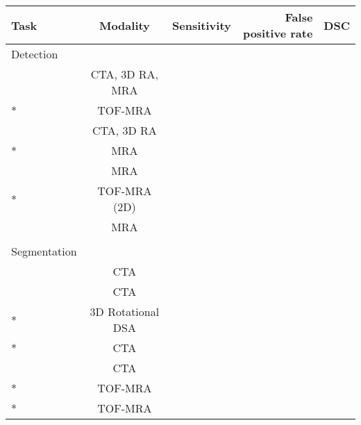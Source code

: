 \begin{table}[t]
	\centering
	\begin{tabular}{l c r r r}
		Task & Modality & Sensitivity & False positive rate & DSC \\
		\hline
		Detection & & & & \\
		\hspace{5mm}\citeauthor{Hentschke2014} & CTA, 3D RA, MRA & & & \\
		\hspace{5mm}\citeauthor{Joo2020}* & TOF-MRA & & & \\
		\hspace{5mm}\citeauthor{Lauric2010} & CTA, 3D RA & & & \\
		\hspace{5mm}\citeauthor{Nakao2018}* & MRA & & & \\
		\hspace{5mm}\citeauthor{Suniaga2012} & MRA & & & \\
		\hspace{5mm}\citeauthor{Ueda2019}* & TOF-MRA (2D) & & & \\
		\hspace{5mm}\citeauthor{Yang2011} & MRA & & & \\		
		& & & & \\
		Segmentation & & & & \\
		\hspace{5mm}\citeauthor{Bogunovic2011} & CTA & & & \\
		\hspace{5mm}\citeauthor{Firouzian2011} & CTA & & & \\
		\hspace{5mm}\citeauthor{Liu2021}*  & 3D Rotational DSA & & & \\
		\hspace{5mm}\citeauthor{Park2019}* & CTA & & & \\
		\hspace{5mm}\citeauthor{Sen2013} & CTA & & & \\
		\hspace{5mm}\citeauthor{Sichermann2019}* & TOF-MRA & & & \\
		\hspace{5mm}\citeauthor{Yang2020}* & TOF-MRA & & & \\

		
	\end{tabular}
	\caption{ }
	\label{table:related_work}
\end{table}








